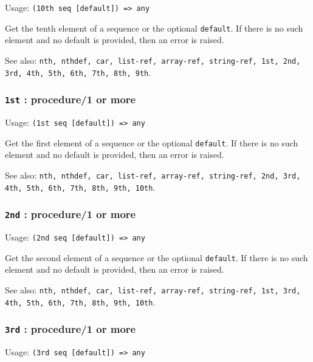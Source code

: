 \documentclass[
]{article}
\newcommand{\passthrough}[1]{#1}
\begin{document}
Usage: \passthrough{\lstinline!(10th seq [default]) => any!}

Get the tenth element of a sequence or the optional
\passthrough{\lstinline!default!}. If there is no such element and no
default is provided, then an error is raised.

See also:
\passthrough{\lstinline!nth, nthdef, car, list-ref, array-ref, string-ref, 1st, 2nd, 3rd, 4th, 5th, 6th, 7th, 8th, 9th!}.

\hypertarget{st-procedure1-or-more}{%
\subsubsection{\texorpdfstring{\texttt{1st} : procedure/1 or
more}{1st : procedure/1 or more}}\label{st-procedure1-or-more}}

Usage: \passthrough{\lstinline!(1st seq [default]) => any!}

Get the first element of a sequence or the optional
\passthrough{\lstinline!default!}. If there is no such element and no
default is provided, then an error is raised.

See also:
\passthrough{\lstinline!nth, nthdef, car, list-ref, array-ref, string-ref, 2nd, 3rd, 4th, 5th, 6th, 7th, 8th, 9th, 10th!}.

\hypertarget{nd-procedure1-or-more}{%
\subsubsection{\texorpdfstring{\texttt{2nd} : procedure/1 or
more}{2nd : procedure/1 or more}}\label{nd-procedure1-or-more}}

Usage: \passthrough{\lstinline!(2nd seq [default]) => any!}

Get the second element of a sequence or the optional
\passthrough{\lstinline!default!}. If there is no such element and no
default is provided, then an error is raised.

See also:
\passthrough{\lstinline!nth, nthdef, car, list-ref, array-ref, string-ref, 1st, 3rd, 4th, 5th, 6th, 7th, 8th, 9th, 10th!}.

\hypertarget{rd-procedure1-or-more}{%
\subsubsection{\texorpdfstring{\texttt{3rd} : procedure/1 or
more}{3rd : procedure/1 or more}}\label{rd-procedure1-or-more}}

Usage: \passthrough{\lstinline!(3rd seq [default]) => any!}
\end{document}
